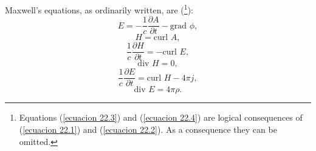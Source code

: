 Maxwell's equations, as ordinarily written, are (\footnote{Equations (\ref{ecuacion 22.3}) and (\ref{ecuacion 
22.4}) are logical consequences of (\ref{ecuacion 22.1}) and (\ref{ecuacion 22.2}). As a consequence they can be 
omitted.}):
\begin{equation}
 \label{ecuacion 23.1}
 E = - \frac{1}{c}\frac{\partial A}{\partial t} - \mbox{grad }\phi,
\end{equation}
\begin{equation}
 \label{ecuacion 23.2}
 H = \mbox{curl } A,
\end{equation}
\begin{equation}
 \label{ecuacion 23.3}
 \frac{1}{c}\frac{\partial H}{\partial t} = - \mbox{curl } E,
\end{equation}
\begin{equation}
 \label{ecuacion 23.4}
 \mbox{div } H = 0,
\end{equation}
\begin{equation}
 \label{ecuacion 23.5}
 \frac{1}{c}\frac{\partial E}{\partial t} = \mbox{curl } H - 4 \pi j,
\end{equation}
\begin{equation}
 \label{ecuacion 23.6}
 \mbox{div } E = 4 \pi \rho.
\end{equation}






